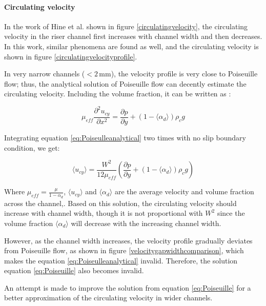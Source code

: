 \paragraph{Circulating velocity}
\*

In the work of Hine et al. \cite{Hine1980} shown in figure \ref{circulatingvelocity}, the circulating velocity in the riser channel first increases with channel width and then decreases. In this work, similar phenomena are found as well, and the circulating velocity is shown in figure \ref{circulatingvelocityprofile}. 

In very narrow channels ($< 2\, \mathrm{mm}$), the velocity profile is very close to Poiseuille flow; thus, the analytical solution of Poiseuille flow can decently estimate the circulating velocity. Including the volume fraction, it can be written as \cite{Haverkort2020}:

\begin{equation}\label{eq:Poiseulleanalytical}
    \mu_{eff} \frac{\partial^2 u_{cy}}{\partial x^2} = \frac{\partial p}{\partial y} + (1-\langle \alpha_d \rangle) \rho_c g
\end{equation}

Integrating equation \ref{eq:Poiseulleanalytical} two times with no slip boundary condition, we get:

\begin{equation}\label{eq:Poiseuille}
    \langle u_{cy} \rangle =  \frac{W^2}{12\mu_{eff}} (\frac{\partial p}{\partial y} + (1-\langle \alpha_d \rangle)\rho_c g)
\end{equation}

Where $\mu_{eff} = \frac{\mu}{1-\alpha_d}$,  $\langle u_{cy} \rangle$ and $\langle \alpha_d \rangle$ are the average velocity and volume fraction across the channel,. Based on this solution, the circulating velocity should increase with channel width, though it is not proportional with $W^2$ since the volume fraction $\langle \alpha_d \rangle$ will decrease with the increasing channel width. 

However, as the channel width increases, the velocity profile gradually deviates from Poiseuille flow, as shown in figure \ref{velocitygapwidthcomparison}, which makes the equation \ref{eq:Poiseulleanalytical} invalid. Therefore, the solution equation \ref{eq:Poiseuille} also becomes invalid.

An attempt is made to improve the solution from equation \ref{eq:Poiseuille} for a better approximation of the circulating velocity in wider channels. 

